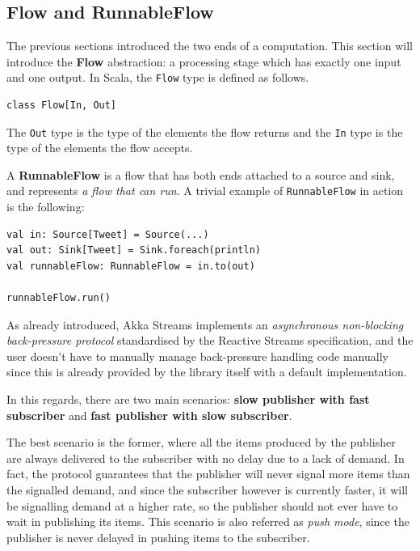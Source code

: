\subsection{Flow and RunnableFlow}\label{flow-and-runnableflow}

The previous sections introduced the two ends of a computation. This
section will introduce the \textbf{Flow} abstraction: a processing stage
which has exactly one input and one output. In Scala, the \texttt{Flow}
type is defined as follows.

\begin{verbatim}
class Flow[In, Out]
\end{verbatim}

The \texttt{Out} type is the type of the elements the flow returns and
the \texttt{In} type is the type of the elements the flow accepts.

A \textbf{RunnableFlow} is a flow that has both ends attached to a
source and sink, and represents \emph{a flow that can run}. A trivial
example of \texttt{RunnableFlow} in action is the following:

\begin{verbatim}
val in: Source[Tweet] = Source(...)
val out: Sink[Tweet] = Sink.foreach(println)
val runnableFlow: RunnableFlow = in.to(out)

runnableFlow.run()
\end{verbatim}

As already introduced, Akka Streams implements an \emph{asynchronous
non-blocking back-pressure protocol} standardised by the Reactive
Streams specification, and the user doesn't have to manually manage
back-pressure handling code manually since this is already provided by
the library itself with a default implementation.

In this regards, there are two main scenarios: \textbf{slow publisher
with fast subscriber} and \textbf{fast publisher with slow subscriber}.

The best scenario is the former, where all the items produced by the
publisher are always delivered to the subscriber with no delay due to a
lack of demand. In fact, the protocol guarantees that the publisher will
never signal more items than the signalled demand, and since the
subscriber however is currently faster, it will be signalling demand at
a higher rate, so the publisher should not ever have to wait in
publishing its items. This scenario is also referred as \emph{push
mode}, since the publisher is never delayed in pushing items to the
subscriber.

